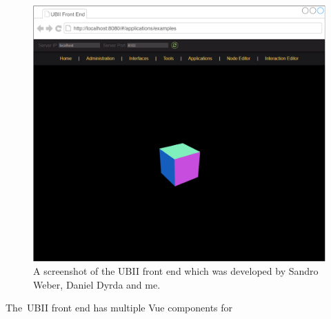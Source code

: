 \begin{figure}[htpb]
    \centering
    \includegraphics[width=12cm]{figures/ubii_front_end.pdf}
    \caption[The UBII Front End]{A screenshot of the UBII front end which was developed by Sandro Weber, Daniel Dyrda and me.}\label{fig:ubii_front_end}
  \end{figure}

The~\ac{UBII} front end has multiple Vue components for 